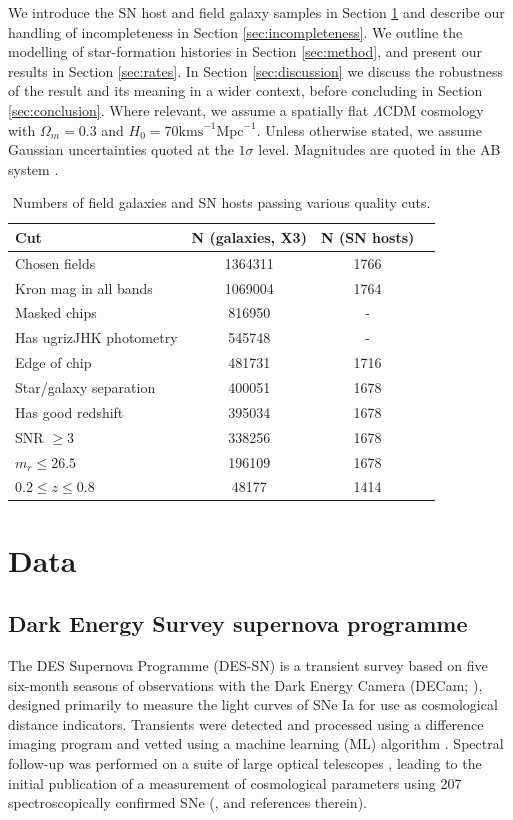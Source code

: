 \documentclass[fleqn,usenatbib]{mnras}
\begin{document}
We introduce the SN host and field galaxy samples in Section \ref{sec:data} and describe our handling of incompleteness in Section \ref{sec:incompleteness}. We outline the modelling of star-formation histories in Section \ref{sec:method}, and present our results in Section \ref{sec:rates}. In Section \ref{sec:discussion} we discuss the robustness of the result and its meaning in a wider context, before concluding in Section \ref{sec:conclusion}.
Where relevant, we assume a spatially flat $\Lambda$CDM cosmology with $\Omega_m = 0.3$ and $H_0 = 70 \mathrm{ km s}^{-1}\mathrm{Mpc}^{-1}$. Unless otherwise stated, we assume Gaussian uncertainties quoted at the $1\sigma$ level. Magnitudes are quoted in the AB system \citep{Oke1983}.


\begin{table}
	\centering
	\caption{Numbers of field galaxies and SN hosts passing various quality cuts.}
	\label{tab:field_vuts}
	\begin{tabular}{lccr} %
		\hline
		Cut & N (galaxies, X3)  & N (SN hosts)\\
		\hline
		Chosen fields & 1364311  & 1766\\
	    Kron mag in all bands & 1069004  & 1764 \\
	    Masked chips & 816950  & - \\
	    Has ugrizJHK photometry & 545748  & -\\
	    Edge of chip & 481731 & 1716 \\
	    Star/galaxy separation & 400051 &  1678\\
	    Has good redshift & 395034 & 1678 \\
	    SNR $\geq 3$& 338256  & 1678 \\
	    $m_r \leq 26.5$ & 196109 &  1678 \\
	    $0.2 \leq z \leq 0.8$ & 48177 & 1414\\ 
	    
		\hline
	\end{tabular}
\end{table}

\section{Data}
\label{sec:data}
\subsection{Dark Energy Survey supernova programme \label{subsec:des}}
The DES Supernova Programme (DES-SN) is a transient survey based on five six-month seasons of observations with the Dark Energy Camera (DECam; \citealt{Flaugher2015}), designed primarily to measure the light curves of SNe Ia for use as cosmological distance indicators. Transients were detected and processed using a difference imaging program \citep{Kessler2015} and vetted using a machine learning (ML) algorithm \citep{Goldstein2015}. Spectral follow-up was performed on a suite of large optical telescopes \citet{Smith2020b}, leading to the initial publication of a measurement of cosmological parameters using 207 spectroscopically confirmed SNe (\citealt{DESCollaboration2018a}, and references therein). 
\end{document}
